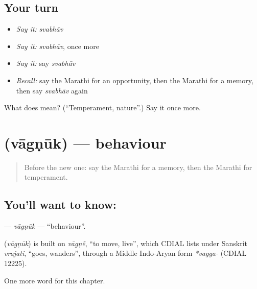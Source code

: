 \subsection*{Your turn}
\begin{itemize}
\raggedright
  \item \emph{Say it:} \emph{svabhāv}
  \item \emph{Say it:} \emph{svabhāv}, once more
  \item \emph{Say it:} say \emph{svabhāv}
  \item \emph{Recall:} say the Marathi for an opportunity, then the Marathi for a memory, then say \emph{svabhāv} again
\end{itemize}

\begin{tcolorbox}[breakable,colback=teal!4,colframe=teal!35!black,title={Before you move on}]
What does  mean? (\textquotedblleft{}Temperament, nature\textquotedblright{}.) Say it once more.
\end{tcolorbox}
\section[\texorpdfstring{\mr{वागणूक} (vāgṇūk)}{वागणूक (vāgṇūk)}]{ (vāgṇūk) — behaviour}

\label{lesson:MR-C273-vagnuk}



\begin{quote}
Before the new one: say the Marathi for a memory, then the Marathi for temperament.
\end{quote}

\subsection*{You'll want to know: }
\textbf{} — \emph{vāgṇūk} — \textquotedblleft{}behaviour\textquotedblright{}.

\begin{cousinweb}
\textbf{} (\emph{vāgṇūk}) is built on \emph{vāgṇẽ}, \textquotedblleft{}to move, live\textquotedblright{}, which CDIAL lists under Sanskrit \emph{vrajati}, \textquotedblleft{}goes, wanders\textquotedblright{}, through a Middle Indo-Aryan form \emph{*vagga-} (CDIAL 12225).
\end{cousinweb}

\begin{grammarlens}[title={What you've built}]
One more word for this chapter.
\end{grammarlens}

